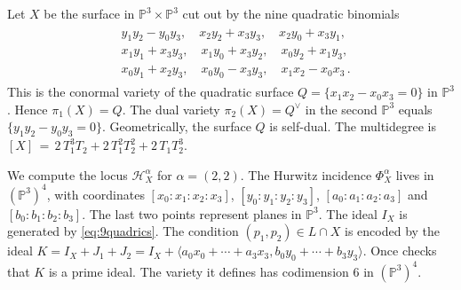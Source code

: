 \documentclass[12pt]{article}
\theoremstyle{definition}
\newenvironment{example}
{\pushQED{\qed}\renewcommand{\qedsymbol}{$\diamond$}\examplex}
{\popQED\endexamplex}
\newcommand{\bP}{\mathbb P}
\newcommand{\cH}{\mathcal H}
\begin{document}
\begin{example} \label{ex:hyperdeterminant}
 Let $X$ be the surface in $\bP^3\times\bP^3$ cut out by the nine quadratic binomials
\begin{align}\label{eq:9quadrics}
\begin{split}
    & y_{1}y_{2}-y_{0}y_{3},\quad x_{2}y_{2}+x_{3}y_{3},\quad x_{2}y_{0}+x_{3}y_{1},\\
    & x_{1}y_{1}+x_{3}y_{3},\quad x_{1}y_{0}+x_{3}y_{2},\quad x_{0}y_{2}+x_{1}y_{3},\\
    & x_{0}y_{1}+x_{2}y_{3},\quad x_{0}y_{0}-x_{3}y_{3},\quad x_{1}x_{2}-x_{0}x_{3}\,.
\end{split}
\end{align}
This is the conormal variety of the quadratic surface 
$Q =\{ x_1x_2 - x_0x_3=0\}$ in $\bP^3$.  Hence $\pi_1(X)=Q$.
The dual variety 
 $\pi_2(X)=Q^\vee$ in the second $\bP^3$ equals $\{y_{1}y_{2}-y_{0}y_{3} = 0\}$.
 Geometrically, the surface $Q$ is self-dual.
  The multidegree is $[X] \,= \,2\,T_1^3T_2 + 2\,T_1^2T_2^2 + 2\,T_1T_2^3$. 

We compute the locus $\cH_X^\alpha$ for $\alpha=(2,2)$. 
The Hurwitz incidence $\Phi^\alpha_X$ lives in $(\bP^3)^4$, with coordinates $[x_0:x_1:x_2:x_3]$, $[y_0:y_1:y_2:y_3]$, $[a_0:a_1:a_2:a_3]$ and $[b_0:b_1:b_2:b_3]$.
The last two points represent planes in $\bP^3$. The ideal $I_X$ is generated by \eqref{eq:9quadrics}. The condition $(p_1,p_2)\in L \cap X$ is encoded by the ideal $K = I _X+ J_1 + J_2 = I_X + \langle a_0x_0+\cdots+a_3x_3,b_0y_0+\cdots+b_3y_3\rangle$.
Once checks that $K$ is a prime ideal. The variety it defines has codimension $6$ in $(\bP^3)^4$. 


\end{example}
\end{document}
